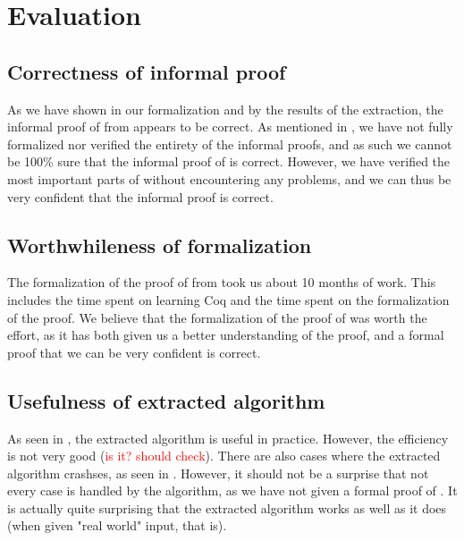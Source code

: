 \chapter{Evaluation}

\section{Correctness of informal proof}

As we have shown in our formalization and by the results of the
extraction, the informal proof of  from \cite{mbezem} appears to be correct.
As mentioned in , we have not fully formalized nor verified the entirety of the informal proofs,
and as such we cannot be 100\% sure that the informal proof of  is correct.
However, we have verified the most important parts of  without
encountering any problems, and we can thus be very confident that the informal proof is correct.

\section{Worthwhileness of formalization}

The formalization of the proof of  from \cite{mbezem} took us about 10 months of work.
This includes the time spent on learning Coq and the time spent on the formalization of the proof.
We believe that the formalization of the proof of  was worth the effort,
as it has both given us a better understanding of the proof,
and a formal proof that we can be very confident is correct.

\section{Usefulness of extracted algorithm}

As seen in , the extracted algorithm is useful in practice.
However, the efficiency is not very good (\textcolor{red}{is it? should check}).
There are also cases where the extracted algorithm crashses, as seen in .
However, it should not be a surprise that not every case is handled by the algorithm,
as we have not given a formal proof of .
It is actually quite surprising that the extracted algorithm works as well as it does
(when given "real world" input, that is).

